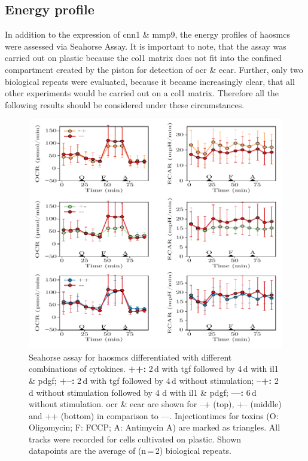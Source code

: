     \subsection{Energy profile}
    \label{subsec:energy}
    In addition to the expression of \ac{cnn1} \& \ac{mmp9}, the energy profiles of \acp{haosmc} were assessed via Seahorse Assay. It is important to note, that the assay was carried out on plastic because the \ac{col1} matrix does not fit into the confined compartment created by the piston for detection of \ac{ocr} \& \ac{ecar}. Further, only two biological repeats were evaluated, because it became increasingly clear, that all other experiments would be carried out on a \ac{col1} matrix. Therefore all the following results should be considered under these circumstances.

    \begin{figure}[h!]
    \capstart
        \centering
        \includegraphics{Abbildung/Seahorse_tracks.pdf}

        \begin{minipage}{\captionwidth}
            \caption[seahorse_tracks]{ \newline Seahorse assay for \acp{haosmc} differentiated with different combinations of cytokines.
            \textbf{++:} 2\,d with \ac{tgf} followed by 4\,d with \ac{il1} \& \ac{pdgf};
            \textbf{+–:} 2\,d with \ac{tgf} followed by 4\,d without stimulation;
            \textbf{–+:} 2\,d without stimulation followed by 4 d with \ac{il1} \& \ac{pdgf};
            \textbf{––:} 6\,d without stimulation.
            \ac{ocr} \& \ac{ecar} are shown for –+ (top), +– (middle) and ++ (bottom) in comparison to ––. Injectiontimes for toxins (O: Oligomycin; F: FCCP; A: Antimycin A) are marked as triangles. All tracks were recorded for cells cultivated on plastic. Shown datapoints are the average of (n\,=\,2) biological repeats.
            }
            \label{fig:seahorse_tracks}
        \end{minipage}
    \end{figure}

